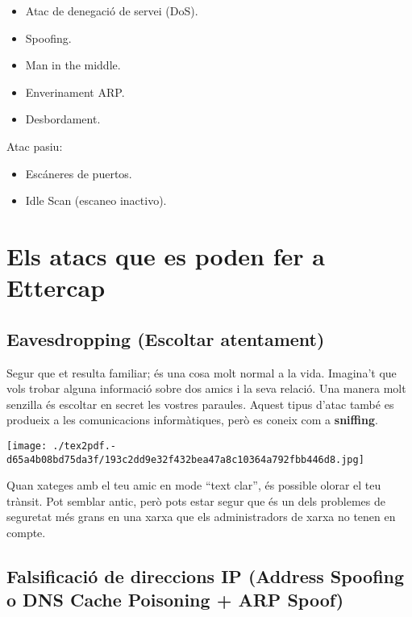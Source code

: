 \documentclass[]{article}
\begin{document}
\begin{itemize}
\item
  Atac de denegació de servei (DoS).
\item
  Spoofing.
\item
  Man in the middle.
\item
  Enverinament ARP.
\item
  Desbordament.
\end{itemize}

Atac pasiu:

\begin{itemize}
\item
  Escáneres de puertos.
\item
  Idle Scan (escaneo inactivo).
\end{itemize}

\hypertarget{els-atacs-que-es-poden-fer-a-ettercap}{%
\section{\texorpdfstring{\textbf{Els atacs que es poden fer a
Ettercap}}{Els atacs que es poden fer a Ettercap}}\label{els-atacs-que-es-poden-fer-a-ettercap}}

\hypertarget{eavesdropping-escoltar-atentament}{%
\subsection{\texorpdfstring{\textbf{Eavesdropping (Escoltar
atentament)}}{Eavesdropping (Escoltar atentament)}}\label{eavesdropping-escoltar-atentament}}

Segur que et resulta familiar; és una cosa molt normal a la vida.
Imagina't que vols trobar alguna informació sobre dos amics i la seva
relació. Una manera molt senzilla és escoltar en secret les vostres
paraules. Aquest tipus d'atac també es produeix a les comunicacions
informàtiques, però es coneix com a \textbf{sniffing}.

\texttt{[image: ./tex2pdf.-d65a4b08bd75da3f/193c2dd9e32f432bea47a8c10364a792fbb446d8.jpg]}

Quan xateges amb el teu amic en mode ``text clar'', és possible olorar
el teu trànsit. Pot semblar antic, però pots estar segur que és un dels
problemes de seguretat més grans en una xarxa que els administradors de
xarxa no tenen en compte.

\hypertarget{falsificaciuxf3-de-direccions-ip-address-spoofing-o-dns-cache-poisoning-arp-spoof}{%
\subsection{\texorpdfstring{\textbf{Falsificació de direccions IP
(Address Spoofing o DNS Cache Poisoning + ARP
Spoof)}}{Falsificació de direccions IP (Address Spoofing o DNS Cache Poisoning + ARP Spoof)}}\label{falsificaciuxf3-de-direccions-ip-address-spoofing-o-dns-cache-poisoning-arp-spoof}}
\end{document}
